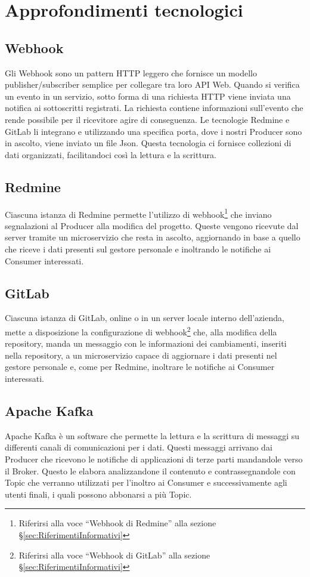 \newpage
\section{Approfondimenti tecnologici}
	
	\subsection{Webhook}
		Gli Webhook sono un pattern HTTP leggero che fornisce un modello publisher/subscriber semplice
		per collegare tra loro API Web.	
		Quando si verifica un evento in un servizio, sotto forma di una richiesta HTTP viene inviata una
		notifica ai sottoscritti registrati. La richiesta contiene informazioni sull'evento che rende
		possibile per il ricevitore agire di conseguenza.
		Le tecnologie Redmine e GitLab li integrano e utilizzando una specifica porta, dove i nostri
		Producer sono in ascolto, viene inviato un file Json. Questa tecnologia ci fornisce
		collezioni di dati organizzati, facilitandoci così la lettura e la scrittura.
	
		\subsection{Redmine}
		Ciascuna istanza di Redmine permette l'utilizzo di webhook\footnote{Riferirsi alla voce ``Webhook di Redmine'' alla sezione \S\ref{sec:RiferimentiInformativi}} che inviano segnalazioni al Producer alla modifica del progetto.
		Queste vengono ricevute dal server tramite un microservizio che resta in ascolto, aggiornando in base a quello che riceve i dati presenti sul gestore personale e inoltrando le notifiche ai Consumer interessati.
		
		\subsection{GitLab}
		Ciascuna istanza di GitLab, online o in un server locale interno dell'azienda, mette a disposizione la configurazione di webhook\footnote{Riferirsi alla voce ``Webhook di GitLab'' alla sezione \S\ref{sec:RiferimentiInformativi}} che, alla modifica della repository, manda un messaggio con le informazioni dei cambiamenti, inseriti nella repository, a un microservizio capace di aggiornare i dati presenti nel gestore personale e, come per Redmine, inoltrare le notifiche ai Consumer interessati.
		
		\subsection{Apache Kafka}
		Apache Kafka è un software  che permette la lettura e la scrittura di messaggi su differenti canali di comunicazioni per i dati.
		Questi messaggi arrivano dai Producer che ricevono le notifiche di applicazioni di terze parti mandandole verso il Broker. Questo le elabora analizzandone il contenuto e contrassegnandole con Topic che verranno utilizzati per l'inoltro ai Consumer e successivamente agli utenti finali, i quali possono abbonarsi a più Topic.
		
